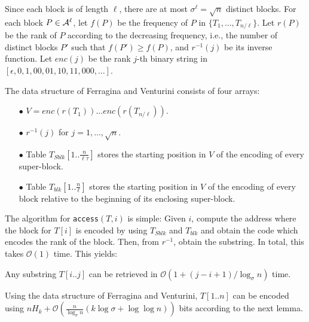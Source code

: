 \documentclass{llncs}
\newcommand{\Order}{\mathcal{O}}
\begin{document}
Since each block is of length $\ell$, there are 
at most $\sigma^{\ell} = \sqrt{n}$ distinct blocks.
For each block $P \in {{\cal A}}^{\ell}$,
let $f(P)$ be
the frequency of $P$ in $\{T_1, \ldots, T_{n/\ell} \}$.
Let $r(P)$ be the rank of $P$ according to the
decreasing frequency, i.e., the number of distinct blocks $P'$ such that $f(P') \ge f(P)$,
and $r^{-1}(j)$ be its inverse function.
Let $enc(j)$ be the rank $j$-th binary string in
$[\epsilon, 0, 1, 00, 01, 10, 11, 000, \ldots]$.


The data structure of Ferragina and Venturini consists of four arrays:
\begin{itemize}
\item[{\raise0.3pt\hbox{$\bullet$}}]
$V = enc(r(T_1)) \ldots enc(r(T_{n/\ell}))$.

\item[{\raise0.3pt\hbox{$\bullet$}}]
$r^{-1}(j)$ for $j=1, \ldots, \sqrt{n}$.

\item[{\raise0.3pt\hbox{$\bullet$}}]
Table $T_{Sblk}[1..\frac{n}{\ell \tau}]$ stores 
the starting position in $V$ of the encoding of every super-block.

\item[{\raise0.3pt\hbox{$\bullet$}}]
Table $T_{blk}[1..\frac{n}{\ell}]$ stores
the starting position in $V$ of the encoding of every block relative to 
the beginning of its enclosing super-block.
\end{itemize}


The algorithm for \textnormal{\texttt{access}}$(T,i)$ is simple:
Given $i$, compute the address where the block for $T[i]$ is encoded by
using $T_{Sblk}$ and $T_{blk}$ and obtain the code which encodes the rank
of the block.
Then, from $r^{-1}$, obtain the substring.
In total, this takes $\Order(1)$ time.
This yields:

\begin{lemma}
Any substring $T[i..j]$ can be retrieved in
$\Order(1 + (j-i+1)/\log_{\sigma} n)$ time.
\end{lemma}

Using the data structure of Ferragina and Venturini,
$T[1..n]$ can be encoded using $n H_k + \Order(\frac{n}{\log_{\sigma} n} (k \log \sigma + \log \log n))$ bits according to the next lemma.
\end{document}
